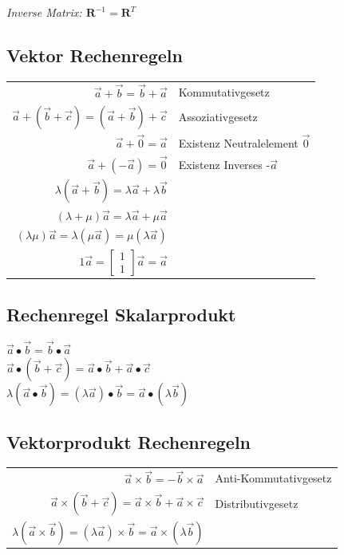 \textit{Inverse Matrix: $\mathbf{R}^{-1} = \mathbf{R}^T$}

\subsection{Vektor Rechenregeln}

\begin{tabular}{r|l}
    $\vec{a} + \vec{b} = \vec{b} + \vec{a}$ & Kommutativgesetz \\
    $\vec{a} + (\vec{b} + \vec{c}) = (\vec{a} + \vec{b}) + \vec{c}$ & Assoziativgesetz \\
    $\vec{a} + \vec{0} = \vec{a}$ & Existenz Neutralelement $\vec{0}$ \\
    $\vec{a} + (-\vec{a}) = \vec{0}$ & Existenz Inverses -$\vec{a}$ \\
    $\lambda(\vec{a} + \vec{b}) = \lambda \vec{a} + \lambda \vec{b}$ \\
    $(\lambda + \mu) \vec{a} = \lambda \vec{a} + \mu \vec{a}$ \\
    $(\lambda \mu) \vec{a} = \lambda(\mu \vec{a}) = \mu (\lambda \vec{a})$ \\
    $1 \vec{a} = \begin{bmatrix}
        1 \\
        1
    \end{bmatrix} \vec{a} = \vec{a}$

\end{tabular}

\subsection{Rechenregel Skalarprodukt}

$\vec{a} \bullet \vec{b} = \vec{b} \bullet \vec{a}$ \\
$\vec{a} \bullet (\vec{b} + \vec{c}) = \vec{a} \bullet \vec{b} + \vec{a} \bullet \vec{c}$ \\
$\lambda (\vec{a} \bullet \vec{b}) = (\lambda \vec{a}) \bullet \vec{b} = \vec{a} \bullet (\lambda \vec{b})$

\subsection{Vektorprodukt Rechenregeln}

\begin{tabular}{r|l}
    $\vec{a} \times \vec{b} = -\vec{b} \times \vec{a}$ & Anti-Kommutativgesetz \\
    $\vec{a} \times (\vec{b} + \vec{c}) = \vec{a} \times \vec{b} + \vec{a} \times \vec{c}$ & Distributivgesetz \\
    $\lambda (\vec{a} \times \vec{b}) = (\lambda \vec{a}) \times \vec{b} = \vec{a} \times (\lambda \vec{b})$
\end{tabular}

